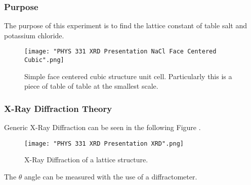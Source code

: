 \documentclass{beamer}
\begin{document}

\begin{frame}
\frametitle{Purpose}
The purpose of this experiment is to find the lattice constant of table salt and potassium chloride.
\begin{figure}[htbp]
\begin{center}
\texttt{[image: "PHYS 331 XRD Presentation NaCl Face Centered Cubic".png]}
\caption{Simple face centered cubic structure unit cell. Particularly this is a piece of table of table at the smallest scale.}
\end{center}
\end{figure}
\end{frame}


\begin{frame}
\frametitle{X-Ray Diffraction Theory}
Generic X-Ray Diffraction can be seen in the following Figure \cite{X-RayCryst}.
\begin{figure}[htbp]
\begin{center}
\texttt{[image: "PHYS 331 XRD Presentation XRD".png]}
\caption{\small{X-Ray Diffraction of a lattice structure.}}
\label{default}
\end{center}
\end{figure}
The $\theta$ angle can be measured with the use of a diffractometer.
\end{frame}

\end{document}
